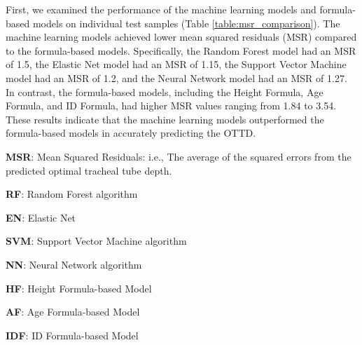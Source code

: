 \documentclass[11pt]{article}
\begin{document}
First, we examined the performance of the machine learning models and formula-based models on individual test samples (Table \ref{table:msr_comparison}). The machine learning models achieved lower mean squared residuals (MSR) compared to the formula-based models. Specifically, the Random Forest model had an MSR of 1.5, the Elastic Net model had an MSR of 1.15, the Support Vector Machine model had an MSR of 1.2, and the Neural Network model had an MSR of 1.27. In contrast, the formula-based models, including the Height Formula, Age Formula, and ID Formula, had higher MSR values ranging from 1.84 to 3.54. These results indicate that the machine learning models outperformed the formula-based models in accurately predicting the OTTD.

\begin{table}[h]
\caption{Comparison of Mean Squared Residuals between Machine Learning and Formula-based Models}
\label{table:msr_comparison}
\begin{threeparttable}
\renewcommand{\TPTminimum}{\linewidth}
\begin{tablenotes}
\footnotesize
\item \textbf{MSR}: Mean Squared Residuals: i.e., The average of the squared errors from the predicted optimal tracheal tube depth.
\item \textbf{RF}: Random Forest algorithm
\item \textbf{EN}: Elastic Net
\item \textbf{SVM}: Support Vector Machine algorithm
\item \textbf{NN}: Neural Network algorithm
\item \textbf{HF}: Height Formula-based Model
\item \textbf{AF}: Age Formula-based Model
\item \textbf{IDF}: ID Formula-based Model
\end{tablenotes}
\end{threeparttable}
\end{table}
\end{document}
